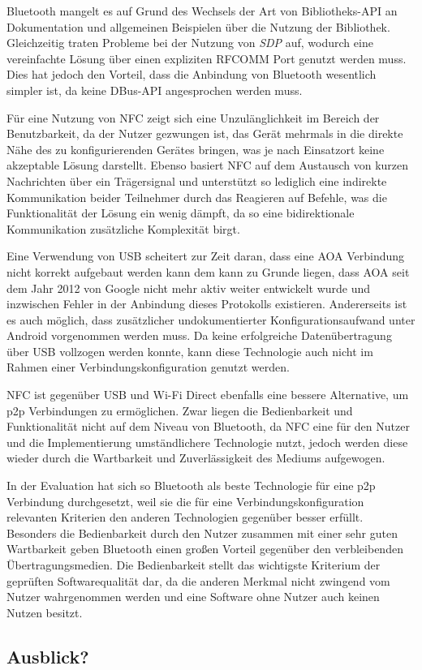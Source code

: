 Bluetooth mangelt es auf Grund des Wechsels der Art von Bibliotheks-API an Dokumentation und allgemeinen Beispielen über die Nutzung der Bibliothek. Gleichzeitig traten Probleme bei der Nutzung von {\it SDP} auf, wodurch eine vereinfachte Lösung über einen expliziten RFCOMM Port genutzt werden muss. Dies hat jedoch den Vorteil, dass die Anbindung von Bluetooth wesentlich simpler ist, da keine DBus-API angesprochen werden muss.

Für eine Nutzung von NFC zeigt sich eine Unzulänglichkeit im Bereich der Benutzbarkeit, da der Nutzer gezwungen ist, das Gerät mehrmals in die direkte Nähe des zu konfigurierenden Gerätes bringen, was je nach Einsatzort keine akzeptable Lösung darstellt. Ebenso basiert NFC auf dem Austausch von kurzen Nachrichten über ein Trägersignal und unterstützt so lediglich eine indirekte Kommunikation  beider Teilnehmer durch das Reagieren auf Befehle, was die Funktionalität der Lösung ein wenig dämpft, da so eine bidirektionale Kommunikation zusätzliche Komplexität birgt.

Eine Verwendung von USB scheitert zur Zeit daran, dass eine AOA Verbindung nicht korrekt aufgebaut werden kann dem kann zu Grunde liegen, dass AOA seit dem Jahr 2012 von Google nicht mehr aktiv weiter entwickelt wurde und inzwischen Fehler in der Anbindung dieses Protokolls existieren. Andererseits ist es auch möglich, dass zusätzlicher undokumentierter Konfigurationsaufwand unter Android vorgenommen werden muss. Da keine erfolgreiche Datenübertragung über USB vollzogen werden konnte, kann diese Technologie auch nicht im Rahmen einer Verbindungskonfiguration genutzt werden.

NFC ist gegenüber USB und Wi-Fi Direct ebenfalls eine bessere Alternative, um p2p Verbindungen zu ermöglichen. Zwar liegen die Bedienbarkeit und Funktionalität nicht auf dem Niveau von Bluetooth, da NFC eine für den Nutzer und die Implementierung umständlichere Technologie nutzt, jedoch werden diese wieder durch die Wartbarkeit und Zuverlässigkeit des Mediums aufgewogen.

In der Evaluation hat sich so Bluetooth als beste Technologie für eine p2p Verbindung durchgesetzt, weil sie die für eine Verbindungskonfiguration relevanten Kriterien den anderen Technologien gegenüber besser erfüllt. Besonders die Bedienbarkeit durch den Nutzer zusammen mit einer sehr guten Wartbarkeit geben Bluetooth einen großen Vorteil gegenüber den verbleibenden Übertragungsmedien. Die Bedienbarkeit stellt das wichtigste Kriterium  der geprüften Softwarequalität dar, da die anderen Merkmal nicht zwingend vom Nutzer wahrgenommen werden und eine Software ohne Nutzer auch keinen Nutzen besitzt.

\subsection{Ausblick?}
